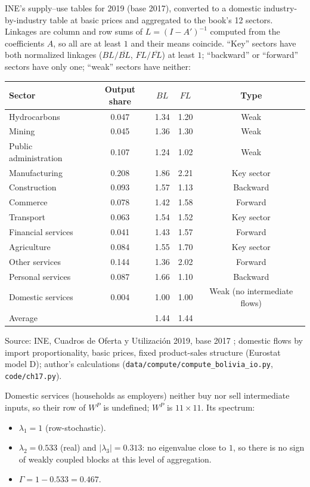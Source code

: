\documentclass[../structural_economics_book.tex]{subfiles}
\begin{document}
\begin{example}\label{ch17:ex:bolivia_gamma}
INE's supply--use tables for 2019 (base 2017), converted to a domestic industry-by-industry table at basic prices and aggregated to the book's 12 sectors. Linkages are column and row sums of $L = (I - A')^{-1}$ computed from the coefficients $A$, so all are at least $1$ and their means coincide. ``Key'' sectors have both normalized linkages ($BL/\overline{BL}$, $FL/\overline{FL}$) at least $1$; ``backward'' or ``forward'' sectors have only one; ``weak'' sectors have neither:

\begin{center}
\begin{tabular}{lcccc}
\toprule
Sector & Output share & $BL$ & $FL$ & Type \\
\midrule
Hydrocarbons & 0.047 & 1.34 & 1.20 & Weak \\
Mining & 0.045 & 1.36 & 1.30 & Weak \\
Public administration & 0.107 & 1.24 & 1.02 & Weak \\
Manufacturing & 0.208 & 1.86 & 2.21 & Key sector \\
Construction & 0.093 & 1.57 & 1.13 & Backward \\
Commerce & 0.078 & 1.42 & 1.58 & Forward \\
Transport & 0.063 & 1.54 & 1.52 & Key sector \\
Financial services & 0.041 & 1.43 & 1.57 & Forward \\
Agriculture & 0.084 & 1.55 & 1.70 & Key sector \\
Other services & 0.144 & 1.36 & 2.02 & Forward \\
Personal services & 0.087 & 1.66 & 1.10 & Backward \\
Domestic services & 0.004 & 1.00 & 1.00 & Weak (no intermediate flows) \\
\midrule
Average & & 1.44 & 1.44 & \\
\bottomrule
\end{tabular}
\par\footnotesize Source: INE, Cuadros de Oferta y Utilizaci\'{o}n 2019, base 2017 \citep{ine2026sut}; domestic flows by import proportionality, basic prices, fixed product-sales structure (Eurostat model D); author's calculations (\texttt{data/compute/compute\_bolivia\_io.py}, \texttt{code/ch17.py}).
\end{center}

Domestic services (households as employers) neither buy nor sell intermediate inputs, so their row of $W^P$ is undefined; $W^P$ is $11 \times 11$. Its spectrum:
\begin{itemize}
\item $\lambda_1 = 1$ (row-stochastic).
\item $\lambda_2 = 0.533$ (real) and $|\lambda_3| = 0.313$: no eigenvalue close to $1$, so there is no sign of weakly coupled blocks at this level of aggregation.
\item $\Gamma = 1 - 0.533 = 0.467$.
\end{itemize}


\end{example}
\end{document}
